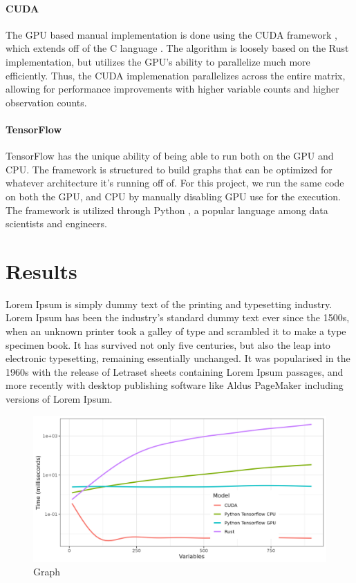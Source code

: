\documentclass[12pt]{article}
\newcommand{\CC}{C\nolinebreak\hspace{-.05em}\raisebox{.4ex}{\tiny\bf +}\nolinebreak\hspace{-.10em}\raisebox{.4ex}{\tiny\bf +} }
\begin{document}
\paragraph{CUDA}
The GPU based manual implementation is done using the CUDA framework \cite{lib_cuda}, which extends off of the \CC language \cite{lang_c++}.
The algorithm is loosely based on the Rust implementation, but utilizes the GPU's ability to parallelize much more efficiently.
Thus, the CUDA implemenation parallelizes across the entire matrix, allowing for performance improvements with higher variable counts and higher observation counts.

\paragraph{TensorFlow}
TensorFlow \cite{lib_tensorflow} has the unique ability of being able to run both on the GPU and CPU.
The framework is structured to build graphs that can be optimized for whatever architecture it's running off of.
For this project, we run the same code on both the GPU, and CPU by manually disabling GPU use for the execution.
The framework is utilized through Python \cite{lang_python}, a popular language among data scientists and engineers.

\section{Results}

Lorem Ipsum is simply dummy text of the printing and typesetting industry. Lorem Ipsum has been the industry's standard dummy text ever since the 1500s, when an unknown printer took a galley of type and scrambled it to make a type specimen book. It has survived not only five centuries, but also the leap into electronic typesetting, remaining essentially unchanged. It was popularised in the 1960s with the release of Letraset sheets containing Lorem Ipsum passages, and more recently with desktop publishing software like Aldus PageMaker including versions of Lorem Ipsum.

\begin{figure}[h]
    \includegraphics[width=\linewidth]{variables.png}
    \caption{Graph}
    \label{fig:graph_variables}
\end{figure}
\end{document}
